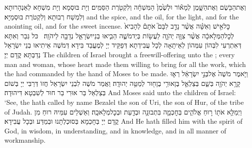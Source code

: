 {וְאֶת\maqqaf הַבֹּ֖שֶׂם וְאֶת\maqqaf הַשָּׁ֑מֶן לְמָא֕וֹר וּלְשֶׁ֙מֶן֙ הַמִּשְׁחָ֔ה וְלִקְטֹ֖רֶת הַסַּמִּֽים׃}
{וְיָת בּוּסְמָא וְיָת מִשְׁחָא לְאַנְהָרוּתָא וְלִמְשַׁח רְבוּתָא וְלִקְטֹרֶת בּוּסְמַיָּא׃}
{and the spice, and the oil, for the light, and for the anointing oil, and for the sweet incense.}{}
{כׇּל\maqqaf אִ֣ישׁ וְאִשָּׁ֗ה אֲשֶׁ֨ר נָדַ֣ב לִבָּם֮ אֹתָם֒ לְהָבִיא֙ לְכׇל\maqqaf הַמְּלָאכָ֔ה אֲשֶׁ֨ר צִוָּ֧ה יְהֹוָ֛ה לַעֲשׂ֖וֹת בְּיַד\maqqaf מֹשֶׁ֑ה הֵבִ֧יאוּ בְנֵי\maqqaf יִשְׂרָאֵ֛ל נְדָבָ֖ה לַיהֹוָֽה׃ \petucha }
{כּל גְּבַר וְאִתָּא דְּאִתְרְעִי לִבְּהוֹן עִמְּהוֹן לְאֵיתָאָה לְכָל עֲבִידְתָא דְּפַקֵּיד יְיָ לְמֶעֱבַד בִּידָא דְּמֹשֶׁה אֵיתִיאוּ בְנֵי יִשְׂרָאֵל נְדַבְתָּא קֳדָם יְיָ׃}
{The children of Israel brought a freewill-offering unto the \lord; every man and woman, whose heart made them willing to bring for all the work, which the \lord\space had commanded by the hand of Moses to be made.}{}
{וַיֹּ֤אמֶר מֹשֶׁה֙ אֶל\maqqaf בְּנֵ֣י יִשְׂרָאֵ֔ל רְא֛וּ קָרָ֥א יְהֹוָ֖ה בְּשֵׁ֑ם בְּצַלְאֵ֛ל בֶּן\maqqaf אוּרִ֥י בֶן\maqqaf ח֖וּר לְמַטֵּ֥ה יְהוּדָֽה׃}
{וַאֲמַר מֹשֶׁה לִבְנֵי יִשְׂרָאֵל חֲזוֹ דְּרַבִּי יְיָ בְּשׁוֹם בְּצַלְאֵל בַּר אוּרִי בַר חוּר לְשִׁבְטָא דִּיהוּדָה׃}
{And Moses said unto the children of Israel: ‘See, the \lord\space hath called by name Bezalel the son of Uri, the son of Hur, of the tribe of Judah.}{}
{וַיְמַלֵּ֥א אֹת֖וֹ ר֣וּחַ אֱלֹהִ֑ים בְּחׇכְמָ֛ה בִּתְבוּנָ֥ה וּבְדַ֖עַת וּבְכׇל\maqqaf מְלָאכָֽה׃}
{וְאַשְׁלֵים עִמֵּיהּ רוּחַ מִן קֳדָם יְיָ בְּחָכְמָא בְּסוּכְלְתָנוּ וּבְמַדַּע וּבְכָל עֲבִידָא׃}
{And He hath filled him with the spirit of God, in wisdom, in understanding, and in knowledge, and in all manner of workmanship.}{}
